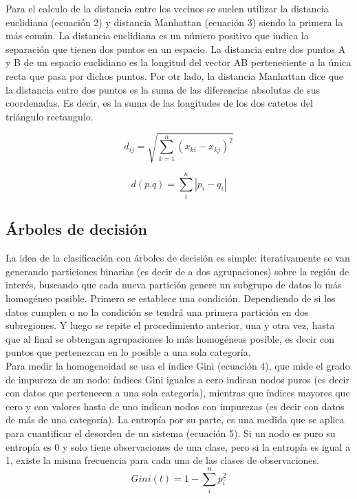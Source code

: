 \documentclass[conference]{IEEEtran}
\begin{document}
Para el calculo de la distancia entre los vecinos se suelen utilizar la distancia euclidiana (ecuación 2) y distancia Manhattan (ecuación 3) siendo la primera la más común. La distancia euclidiana es un número positivo que indica la separación que tienen dos puntos en un espacio. La distancia entre dos puntos A y B de un espacio euclidiano es la longitud del vector AB perteneciente a la única recta que pasa por dichos puntos. Por otr lado, la distancia Manhattan dice que la distancia entre dos puntos es la suma de las diferencias absolutas de sus coordenadas. Es decir, es la suma de las longitudes de los dos catetos del triángulo rectangulo.

\begin{equation}
d_{ij}=\sqrt{\sum_{k=1}^{n}(x_{ki}-x_{kj})^2}
\end{equation}

\begin{equation}
d(p.q)=\sum_{i}^{n}|p_i-q_i|
\end{equation}

\subsection{Árboles de decisión}
La idea de la clasificación con árboles de decisión es simple: iterativamente se van generando particiones binarias (es decir de a dos agrupaciones) sobre la región de interés, buscando que cada nueva partición genere un subgrupo de datos lo más homogéneo posible. Primero se establece una condición. Dependiendo de si los datos cumplen o no la condición se tendrá una primera partición en dos subregiones. Y luego se repite el procedimiento anterior, una y otra vez, hasta que al final se obtengan agrupaciones lo más homogéneas posible, es decir con puntos que pertenezcan en lo posible a una sola categoría.\\

Para medir la homogeneidad se usa el índice Gini (ecuación 4), que mide el grado de impureza de un nodo: índices Gini iguales a cero indican nodos puros (es decir con datos que pertenecen a una sola categoría), mientras que índices mayores que cero y con valores hasta de uno indican nodos con impurezas (es decir con datos de más de una categoría). La entropía por su parte, es una medida que se aplica para cuantificar el desorden de un sistema (ecuación 5). Si un nodo es puro su entropía es 0 y solo tiene observaciones de una clase, pero si la entropía es igual a 1, existe la misma frecuencia para cada una de las clases de observaciones.
\begin{equation}
Gini(t)=1- \sum_{i}^{n}p_i^2
\end{equation}
\end{document}

